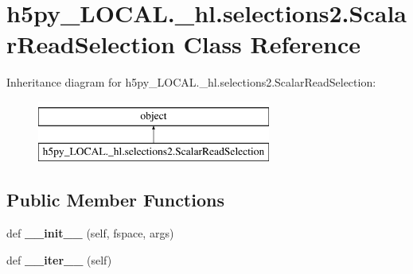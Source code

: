 \hypertarget{classh5py__LOCAL_1_1__hl_1_1selections2_1_1ScalarReadSelection}{}\section{h5py\+\_\+\+L\+O\+C\+A\+L.\+\_\+hl.\+selections2.\+Scalar\+Read\+Selection Class Reference}
\label{classh5py__LOCAL_1_1__hl_1_1selections2_1_1ScalarReadSelection}
Inheritance diagram for h5py\+\_\+\+L\+O\+C\+A\+L.\+\_\+hl.\+selections2.\+Scalar\+Read\+Selection\+:\begin{figure}[H]
\begin{center}
\leavevmode
\includegraphics[height=2.000000cm]{classh5py__LOCAL_1_1__hl_1_1selections2_1_1ScalarReadSelection}
\end{center}
\end{figure}
\subsection*{Public Member Functions}
\begin{DoxyCompactItemize}
\item 
\mbox{\label{classh5py__LOCAL_1_1__hl_1_1selections2_1_1ScalarReadSelection_ae994e42cc7024e5775dc4b0687dbf590}} 
def {\bfseries \+\_\+\+\_\+init\+\_\+\+\_\+} (self, fspace, args)
\item 
\mbox{\label{classh5py__LOCAL_1_1__hl_1_1selections2_1_1ScalarReadSelection_a1c30c89e49d36c0ba76f6522d5b70077}} 
def {\bfseries \+\_\+\+\_\+iter\+\_\+\+\_\+} (self)
\end{DoxyCompactItemize}

